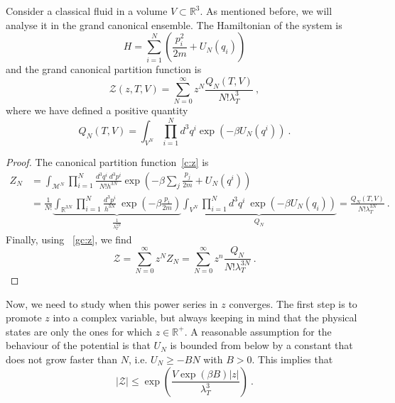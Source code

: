     Consider a classical fluid in a volume $V \subset \mathbb R^3$. As mentioned before, we will analyse it in the grand canonical ensemble. The Hamiltonian of the system is 
    \begin{equation*}
        H = \sum_{i=1}^{N} (\frac{p_i^2}{2m} + U_N (q_i)) 
    \end{equation*}
    and the grand canonical partition function is 
    \begin{equation*}
        \mathcal Z (z, T, V) = \sum_{N=0}^\infty z^N \frac{Q_N (T, V)}{N! \lambda_T^3} ~,
    \end{equation*}
    where we have defined a positive quantity
    \begin{equation*}
        Q_N (T, V) = \int_{V^N} \prod_{i=1}^N d^3 q^i \exp (- \beta U_N(q^i)) ~.
    \end{equation*}
    \begin{proof}
        The canonical partition function~\eqref{c:z} is
        \begin{equation*}
        \begin{aligned}
            Z_N & = \int_{\mathcal M^N} \prod_{i=1}^N \frac{d^3 q^i ~ d^3 p^i}{N! h^{3N}}\exp (- \beta \sum_j \frac{p_j}{2m} + U_N(q^i) ) \\ & = \frac{1}{N!} \underbrace{\int_{\mathbb R^{3N}} \prod_{i=1}^N \frac{d^3 p^i}{h^{3N}} ~ \exp(- \beta \frac{p_i}{2m})}_{\frac{1}{\lambda_T^{3N}}} \underbrace{\int_{V^N} \prod_{i=1}^N d^3 q^i ~\exp(-\beta U_N(q_i))}_{Q_N} = \frac{Q_N(T, V)}{N! \lambda_T^{3N}} ~.
        \end{aligned}
        \end{equation*}
        Finally, using ~\eqref{gc:z}, we find 
        \begin{equation*}
            \mathcal Z = \sum_{N=0}^\infty z^N Z_N = \sum_{N=0}^\infty z^n \frac{Q_N}{N! \lambda_T^{3N}} ~.
        \end{equation*}
    \end{proof}
    Now, we need to study when this power series in $z$ converges. The first step is to promote $z$ into a complex variable, but always keeping in mind that the physical states are only the ones for which $z \in \mathbb R^+$. A reasonable assumption for the behaviour of the potential is that $U_N$ is bounded from below by a constant that does not grow faster than $N$, i.e. $U_N \geq - BN$ with $B > 0$. This implies that 
    \begin{equation*}
        |\mathcal Z| \leq \exp(\frac{V \exp(\beta B) |z|}{\lambda_T^3}) ~.
    \end{equation*}
